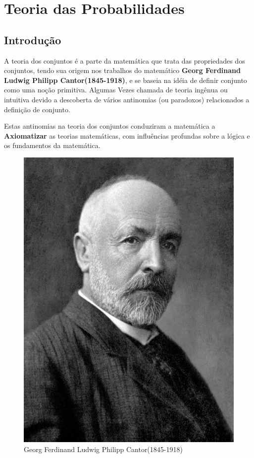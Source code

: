 \chapter{Teoria das Probabilidades}
\section{Introdução}

\inic A teoria dos conjuntos é a parte da matemática que trata das propriedades dos conjuntos, tendo sua origem nos trabalhos do matemático \textbf{Georg Ferdinand Ludwig Philipp Cantor(1845-1918)}, e se baseia na idéia de definir conjunto como uma noção primitiva. Algumas Vezes chamada de teoria ingênua ou intuitiva devido a descoberta de vários antinomias (ou paradoxos) relacionados a definição de conjunto.\vskip0.3cm

\inic Estas antinomias na teoria dos conjuntos conduziram a matemática a \textbf{Axiomatizar} as teorias  matemáticas, com influências profundas sobre a lógica e os fundamentos da matemática.


\begin{figure}
    \centering
    \includegraphics[scale=0.1]{figures/Cantor1.jpeg}
    \caption{Georg Ferdinand
Ludwig Philipp Cantor(1845-1918)}
    \label{fig:my_label}
\end{figure}



